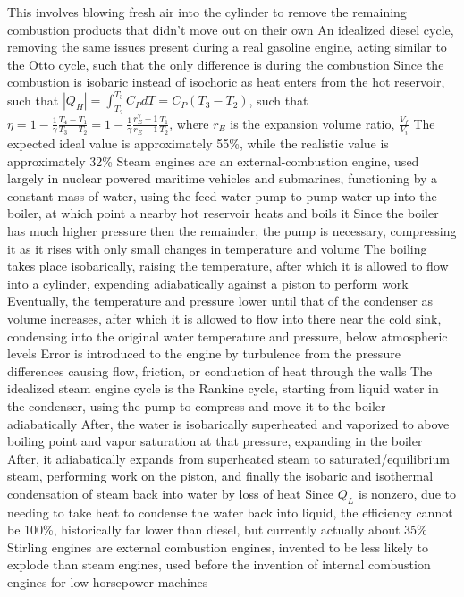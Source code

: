 \begin{outline*}
\3 This involves blowing fresh air into the cylinder to remove the remaining combustion products that didn't move out on their own
\2 An idealized diesel cycle, removing the same issues present during a real gasoline engine, acting similar to the Otto cycle, such that the only difference is during the combustion
\3 Since the combustion is isobaric instead of isochoric as heat enters from the hot reservoir, such that $|Q_H| = \int^{T_3}_{T_2} C_P dT = C_P(T_3 - T_2)$, such that $\eta = 1 - \frac{1}{\gamma}\frac{T_4 - T_1}{T_3 - T_2} = 1 - \frac{1}{\gamma}\frac{r^\gamma_E - 1}{r_E - 1}\frac{T_1}{T_2}$, where $r_E$ is the expansion volume ratio, $\frac{V_f}{V_i}$
\3 The expected ideal value is approximately 55\%, while the realistic value is approximately 32\%
\1 Steam engines are an external-combustion engine, used largely in nuclear powered maritime vehicles and submarines, functioning by a constant mass of water, using the feed-water pump to pump water up into the boiler, at which point a nearby hot reservoir heats and boils it
\2 Since the boiler has much higher pressure then the remainder, the pump is necessary, compressing it as it rises with only small changes in temperature and volume
\3 The boiling takes place isobarically, raising the temperature, after which it is allowed to flow into a cylinder, expending adiabatically against a piston to perform work
\3 Eventually, the temperature and pressure lower until that of the condenser as volume increases, after which it is allowed to flow into there near the cold sink, condensing into the original water temperature and pressure, below atmospheric levels
\2 Error is introduced to the engine by turbulence from the pressure differences causing flow, friction, or conduction of heat through the walls
\2 The idealized steam engine cycle is the Rankine cycle, starting from liquid water in the condenser, using the pump to compress and move it to the boiler adiabatically
\3 After, the water is isobarically superheated and vaporized to above boiling point and vapor saturation at that pressure, expanding in the boiler
\3 After, it adiabatically expands from superheated steam to saturated/equilibrium steam, performing work on the piston, and finally the isobaric and isothermal condensation of steam back into water by loss of heat
\2 Since $Q_L$ is nonzero, due to needing to take heat to condense the water back into liquid, the efficiency cannot be 100\%, historically far lower than diesel, but currently actually about 35\%
\1 Stirling engines are external combustion engines, invented to be less likely to explode than steam engines, used before the invention of internal combustion engines for low horsepower machines

\end{outline*}
